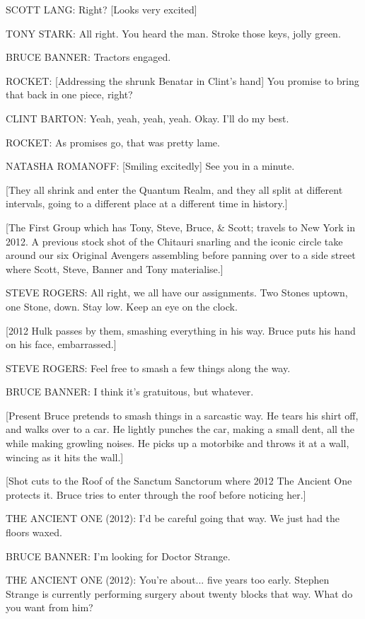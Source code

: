 SCOTT LANG: Right? [Looks very excited]

TONY STARK: All right. You heard the man. Stroke those keys, jolly green.

BRUCE BANNER: Tractors engaged.

ROCKET: [Addressing the shrunk Benatar in Clint's hand] You promise to bring that back in one piece, right?

CLINT BARTON: Yeah, yeah, yeah, yeah. Okay. I'll do my best.

ROCKET: As promises go, that was pretty lame.

NATASHA ROMANOFF: [Smiling excitedly] See you in a minute.

[They all shrink and enter the Quantum Realm, and they all split at different intervals, going to a different place at a different time in history.]

[The First Group which has Tony, Steve, Bruce, & Scott; travels to New York in 2012. A previous stock shot of the Chitauri snarling and the iconic circle take around our six Original Avengers assembling before panning over to a side street where Scott, Steve, Banner and Tony materialise.]

STEVE ROGERS: All right, we all have our assignments. Two Stones uptown, one Stone, down. Stay low. Keep an eye on the clock.

[2012 Hulk passes by them, smashing everything in his way. Bruce puts his hand on his face, embarrassed.]

STEVE ROGERS: Feel free to smash a few things along the way.

BRUCE BANNER: I think it's gratuitous, but whatever.

[Present Bruce pretends to smash things in a sarcastic way. He tears his shirt off, and walks over to a car. He lightly punches the car, making a small dent, all the while making growling noises. He picks up a motorbike and throws it at a wall, wincing as it hits the wall.]

[Shot cuts to the Roof of the Sanctum Sanctorum where 2012 The Ancient One protects it. Bruce tries to enter through the roof before noticing her.]

THE ANCIENT ONE (2012): I'd be careful going that way. We just had the floors waxed.

BRUCE BANNER: I'm looking for Doctor Strange.

THE ANCIENT ONE (2012): You're about... five years too early. Stephen Strange is currently performing surgery about twenty blocks that way. What do you want from him?

